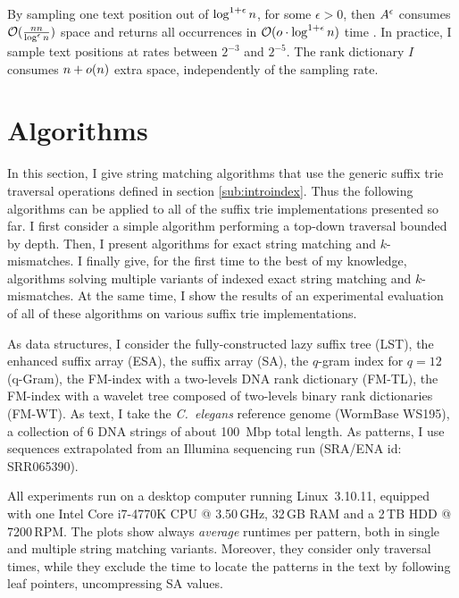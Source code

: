 By sampling one text position out of $\log^{1+\epsilon}{n}$, for some $\epsilon > 0$, then $A^{\epsilon}$ consumes $\mathcal{O}(\frac{n{n}}{\log^{\epsilon}{n}})$ space and  returns all occurrences in $\mathcal{O}(o \cdot \log^{1+\epsilon}{n})$ time \citep{Ferragina2000}.
In practice, I sample text positions at rates between $2^{-3}$ and $2^{-5}$.
The rank dictionary $I$ consumes $n + o(n)$ extra space, independently of the sampling rate.

\section{Algorithms}
\label{sec:index:algo}

In this section, I give string matching algorithms that use the generic suffix trie traversal operations defined in section \ref{sub:introindex}.
Thus the following algorithms can be applied to all of the suffix trie implementations presented so far.
I first consider a simple algorithm performing a top-down traversal bounded by depth.
Then, I present algorithms for exact string matching and $k$-mismatches.%
I finally give, for the first time to the best of my knowledge, algorithms solving multiple variants of indexed exact string matching and $k$-mismatches.
At the same time, I show the results of an experimental evaluation of all of these algorithms on various suffix trie implementations.

As data structures, I consider the fully-constructed lazy suffix tree (LST), the enhanced suffix array (ESA), the suffix array (SA), the $q$-gram index for $q=12$ (q-Gram), the FM-index with a two-levels DNA rank dictionary (FM-TL), the FM-index with a wavelet tree composed of two-levels binary rank dictionaries (FM-WT).
As text, I take the \emph{C.~elegans} reference genome (WormBase WS195), \ie a collection of 6 DNA strings of about 100~Mbp total length.
As patterns, I use sequences extrapolated from an Illumina sequencing run (SRA/ENA id: SRR065390).

All experiments run on a desktop computer running Linux~3.10.11, equipped with one Intel\textsuperscript{\textregistered} Core i7-4770K CPU @ 3.50\,GHz, 32\,GB RAM and a 2\,TB HDD @ 7200\,RPM.
The plots show always \emph{average} runtimes per pattern, both in single and multiple string matching variants.
Moreover, they consider only traversal times, while they exclude the time to locate the patterns in the text by following leaf pointers, \eg uncompressing SA values.

